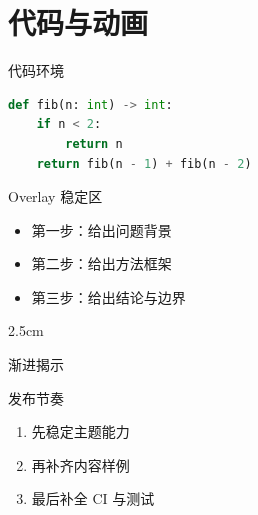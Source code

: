 \section{代码与动画}

\begin{frame}[fragile]{代码环境}
  \begin{lstlisting}[language=Python]
def fib(n: int) -> int:
    if n < 2:
        return n
    return fib(n - 1) + fib(n - 2)
  \end{lstlisting}
\end{frame}

\begin{frame}{Overlay 稳定区}
  \begin{itemize}
    \item<1-> 第一步：给出问题背景
    \item<2-> 第二步：给出方法框架
    \item<3-> 第三步：给出结论与边界
  \end{itemize}

  \begin{overlayarea}{\textwidth}{2.5cm}
  \end{overlayarea}
\end{frame}

\begin{frame}{渐进揭示}
  \begin{block}{发布节奏}
    \begin{enumerate}
      \item<1-> 先稳定主题能力
      \item<2-> 再补齐内容样例
      \item<3-> 最后补全 CI 与测试
    \end{enumerate}
  \end{block}
\end{frame}
